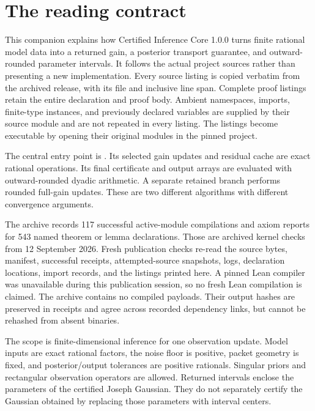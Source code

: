 \documentclass[11pt]{article}\usepackage{needspace}\renewcommand{\paperkind}{Lean companion}\setlength{\parskip}{0.35em}
\begin{document}
\KomorebiCover
{}


\section*{The reading contract}
This companion explains how Certified Inference Core 1.0.0 turns finite rational model data into a returned gain, a posterior transport guarantee, and outward-rounded parameter intervals. It follows the actual project sources rather than presenting a new implementation. Every source listing is copied verbatim from the archived release, with its file and inclusive line span. Complete proof listings retain the entire declaration and proof body. Ambient namespaces, imports, finite-type instances, and previously declared variables are supplied by their source module and are not repeated in every listing. The listings become executable by opening their original modules in the pinned project.

The central entry point is . Its selected gain updates and residual cache are exact rational operations. Its final certificate and output arrays are evaluated with outward-rounded dyadic arithmetic. A separate retained branch performs rounded full-gain updates. These are two different algorithms with different convergence arguments.

The archive records 117 successful active-module compilations and axiom reports for 543 named theorem or lemma declarations. Those are archived kernel checks from 12 September 2026. Fresh publication checks re-read the source bytes, manifest, successful receipts, attempted-source snapshots, logs, declaration locations, import records, and the listings printed here. A pinned Lean compiler was unavailable during this publication session, so no fresh Lean compilation is claimed. The archive contains no compiled  payloads. Their output hashes are preserved in receipts and agree across recorded dependency links, but cannot be rehashed from absent binaries.

The scope is finite-dimensional inference for one observation update. Model inputs are exact rational factors, the noise floor is positive, packet geometry is fixed, and posterior/output tolerances are positive rationals. Singular priors and rectangular observation operators are allowed. Returned intervals enclose the parameters of the certified Joseph Gaussian. They do not separately certify the Gaussian obtained by replacing those parameters with interval centers.
\tableofcontents
\end{document}
